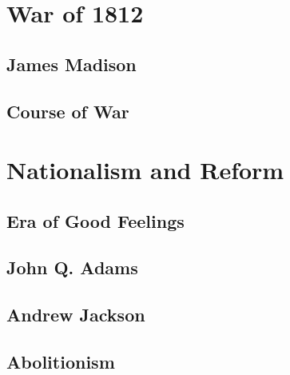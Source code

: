 \section{War of 1812}

\subsection*{James Madison}

\subsection*{Course of War}


\section{Nationalism and Reform}

\subsection*{Era of Good Feelings}


\subsection*{John Q. Adams}



\subsection*{Andrew Jackson}


\subsection*{Abolitionism}

